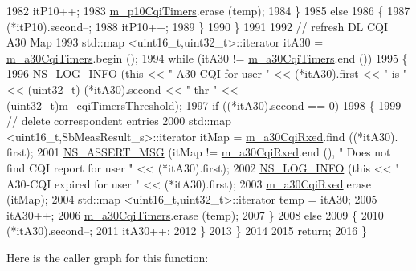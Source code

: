 \begin{DoxyCode}
1982           itP10++;
1983           \hyperlink{classns3_1_1FdMtFfMacScheduler_a5dc227f7ca1e00c530063e52ec1dcc69}{m\_p10CqiTimers}.erase (temp);
1984         \}
1985       \textcolor{keywordflow}{else}
1986         \{
1987           (*itP10).second--;
1988           itP10++;
1989         \}
1990     \}
1991 
1992   \textcolor{comment}{// refresh DL CQI A30 Map}
1993   std::map <uint16\_t,uint32\_t>::iterator itA30 = \hyperlink{classns3_1_1FdMtFfMacScheduler_aea94c05a4b2c5c5392ae3fc2d8b6cd44}{m\_a30CqiTimers}.begin ();
1994   \textcolor{keywordflow}{while} (itA30 != \hyperlink{classns3_1_1FdMtFfMacScheduler_aea94c05a4b2c5c5392ae3fc2d8b6cd44}{m\_a30CqiTimers}.end ())
1995     \{
1996       \hyperlink{group__logging_gafbd73ee2cf9f26b319f49086d8e860fb}{NS\_LOG\_INFO} (\textcolor{keyword}{this} << \textcolor{stringliteral}{" A30-CQI for user "} << (*itA30).first << \textcolor{stringliteral}{" is "} << (uint32\_t)
      (*itA30).second << \textcolor{stringliteral}{" thr "} << (uint32\_t)\hyperlink{classns3_1_1FdMtFfMacScheduler_a2594d67e25a125c89b90a5eba5e46cc9}{m\_cqiTimersThreshold});
1997       \textcolor{keywordflow}{if} ((*itA30).second == 0)
1998         \{
1999           \textcolor{comment}{// delete correspondent entries}
2000           std::map <uint16\_t,SbMeasResult\_s>::iterator itMap = \hyperlink{classns3_1_1FdMtFfMacScheduler_a21ff76bdadf27aac3b87c43f3bc343c8}{m\_a30CqiRxed}.find ((*itA30).
      first);
2001           \hyperlink{assert_8h_aff5ece9066c74e681e74999856f08539}{NS\_ASSERT\_MSG} (itMap != \hyperlink{classns3_1_1FdMtFfMacScheduler_a21ff76bdadf27aac3b87c43f3bc343c8}{m\_a30CqiRxed}.end (), \textcolor{stringliteral}{" Does not find CQI report
       for user "} << (*itA30).first);
2002           \hyperlink{group__logging_gafbd73ee2cf9f26b319f49086d8e860fb}{NS\_LOG\_INFO} (\textcolor{keyword}{this} << \textcolor{stringliteral}{" A30-CQI expired for user "} << (*itA30).first);
2003           \hyperlink{classns3_1_1FdMtFfMacScheduler_a21ff76bdadf27aac3b87c43f3bc343c8}{m\_a30CqiRxed}.erase (itMap);
2004           std::map <uint16\_t,uint32\_t>::iterator temp = itA30;
2005           itA30++;
2006           \hyperlink{classns3_1_1FdMtFfMacScheduler_aea94c05a4b2c5c5392ae3fc2d8b6cd44}{m\_a30CqiTimers}.erase (temp);
2007         \}
2008       \textcolor{keywordflow}{else}
2009         \{
2010           (*itA30).second--;
2011           itA30++;
2012         \}
2013     \}
2014 
2015   \textcolor{keywordflow}{return};
2016 \}
\end{DoxyCode}


Here is the caller graph for this function\+:


